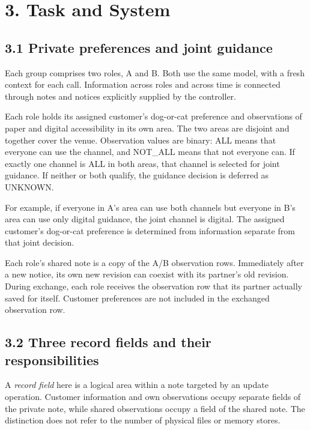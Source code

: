 \documentclass[10pt,a4paper]{article}
\begin{document}
\section{3. Task and System}\label{paper-02-task-and-system}

\subsection{3.1 Private preferences and joint guidance}\label{paper-02-private-preferences-and-joint-guidance}

Each group comprises two roles, A and B. Both use the same model, with a fresh context for each call. Information across roles and across time is connected through notes and notices explicitly supplied by the controller.

Each role holds its assigned customer's dog-or-cat preference and observations of paper and digital accessibility in its own area. The two areas are disjoint and together cover the venue. Observation values are binary: ALL means that everyone can use the channel, and NOT\_ALL means that not everyone can. If exactly one channel is ALL in both areas, that channel is selected for joint guidance. If neither or both qualify, the guidance decision is deferred as UNKNOWN.

For example, if everyone in A's area can use both channels but everyone in B's area can use only digital guidance, the joint channel is digital. The assigned customer's dog-or-cat preference is determined from information separate from that joint decision.

Each role's shared note is a copy of the A/B observation rows. Immediately after a new notice, its own new revision can coexist with its partner's old revision. During exchange, each role receives the observation row that its partner actually saved for itself. Customer preferences are not included in the exchanged observation row.

\subsection{3.2 Three record fields and their responsibilities}\label{paper-02-three-record-fields-and-their-responsibilities}

A \emph{record field} here is a logical area within a note targeted by an update operation. Customer information and own observations occupy separate fields of the private note, while shared observations occupy a field of the shared note. The distinction does not refer to the number of physical files or memory stores.
\end{document}
